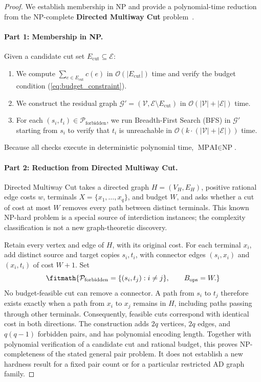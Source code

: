 \begin{proof}
We establish membership in NP and provide a polynomial-time reduction from the NP-complete \textbf{Directed Multiway Cut} problem~\cite{garg1994multiway}.

\paragraph{Part 1: Membership in NP.}
Given a candidate cut set $E_{\text{cut}} \subseteq \mathcal{E}$:
\begin{enumerate}
    \item We compute $\sum_{e \in E_{\text{cut}}} c(e)$ in $\mathcal{O}(|E_{\text{cut}}|)$ time and verify the budget condition (\ref{eq:budget_constraint}).
    \item We construct the residual graph $\mathcal{G}' = (\mathcal{V}, \mathcal{E} \setminus E_{\text{cut}})$ in $\mathcal{O}(|\mathcal{V}| + |\mathcal{E}|)$ time.
    \item For each $(s_i, t_i) \in \mathcal{P}_{\text{forbidden}}$, we run Breadth-First Search (BFS) in $\mathcal{G}'$ starting from $s_i$ to verify that $t_i$ is unreachable in $\mathcal{O}(k \cdot (|\mathcal{V}| + |\mathcal{E}|))$ time.
\end{enumerate}
Because all checks execute in deterministic polynomial time, $\text{MPAI} \in \text{NP}$.

\paragraph{Part 2: Reduction from Directed Multiway Cut.}
Directed Multiway Cut takes a directed graph $H=(V_H,E_H)$, positive rational edge costs $w$, terminals $X=\{x_1,\ldots,x_q\}$, and budget $W$, and asks whether a cut of cost at most $W$ removes every path between distinct terminals. This known NP-hard problem is a special source of interdiction instances; the complexity classification is not a new graph-theoretic discovery.

Retain every vertex and edge of $H$, with its original cost. For each terminal $x_i$, add distinct source and target copies $s_i,t_i$, with connector edges $(s_i,x_i)$ and $(x_i,t_i)$ of cost $W+1$. Set
\begin{equation}
\fitmath{\mathcal{P}_{\mathrm{forbidden}}=\{(s_i,t_j):i\ne j\},\qquad B_{\mathrm{ops}}=W.}
\end{equation}
No budget-feasible cut can remove a connector. A path from $s_i$ to $t_j$ therefore exists exactly when a path from $x_i$ to $x_j$ remains in $H$, including paths passing through other terminals. Consequently, feasible cuts correspond with identical cost in both directions. The construction adds $2q$ vertices, $2q$ edges, and $q(q-1)$ forbidden pairs, and has polynomial encoding length. Together with polynomial verification of a candidate cut and rational budget, this proves NP-completeness of the stated general pair problem. It does not establish a new hardness result for a fixed pair count or for a particular restricted AD graph family.
\end{proof}

